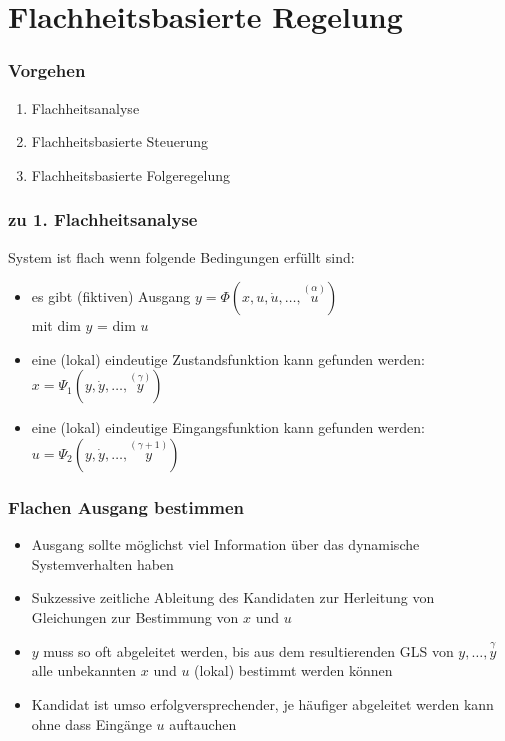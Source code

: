 \documentclass[german]{latex4ei/latex4ei_sheet}
\newcommand{\os}[2]{\ensuremath{\overset{#1}{#2}}}
\begin{document}
\section{Flachheitsbasierte Regelung}
\begin{sectionbox}
\subsubsection{Vorgehen}
\begin{enumerate}
  \item Flachheitsanalyse
  \item Flachheitsbasierte Steuerung
  \item Flachheitsbasierte Folgeregelung
\end{enumerate}

\subsubsection{zu 1. Flachheitsanalyse}

System ist flach wenn folgende Bedingungen erfüllt sind:
\begin{itemize}
  \item es gibt (fiktiven) Ausgang $y = \Phi(x, u, \dot{u}, \dots, \os{(\alpha)}{u})$ \\
    mit dim $y$ = dim $u$
  \item eine (lokal) eindeutige Zustandsfunktion kann gefunden werden: \\
    $x = \Psi_1 (y, \dot{y}, \dots, \os{(\gamma)}{y})$
  \item eine (lokal) eindeutige Eingangsfunktion kann gefunden werden: \\
    $u = \Psi_2 (y, \dot{y}, \dots, \os{(\gamma +1)}{y})$
\end{itemize}

\subsubsection{Flachen Ausgang bestimmen}
\begin{itemize}
  \item Ausgang sollte möglichst viel Information über das dynamische Systemverhalten haben
  \item Sukzessive zeitliche Ableitung des Kandidaten zur Herleitung von Gleichungen zur Bestimmung von $x$ und $u$
  \item $y$ muss so oft abgeleitet werden, bis aus dem resultierenden GLS von $y,\dots,\os{\gamma}{y}$ alle unbekannten $x$ und $u$ (lokal) bestimmt werden können
  \item Kandidat ist umso erfolgversprechender, je häufiger abgeleitet werden kann ohne dass Eingänge $u$ auftauchen
\end{itemize}


\end{sectionbox}
\end{document}
